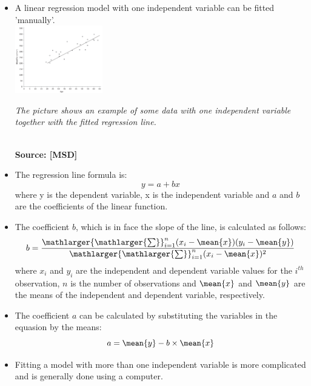 \begin{itemize}
\item A linear regression model with one independent variable can be fitted 'manually'.\\ [1ex]
  \includegraphics[width=0.3\textwidth]{msd6-5_linear_regression.png} \parbox[t]{0.3\textwidth}{\vspace{-20ex}\tiny \emph{The picture shows an example of some data with one independent variable together with the fitted regression line.}} \\ [-2ex]
  {\fontsize{10}{0}\selectfont \textbf{Source: [MSD]}} 
\item The regression line formula is:
  $$ y = a + bx$$
  where y is the dependent variable, x is the independent variable and $a$ and $b$ are the coefficients of the linear function.
\item The coefficient $b$, which is in face the slope of the line, is calculated as follows:
  $$ b = \dfrac{\mathlarger{\mathlarger{\sum}}_{i=1}^n(x_i-\mean{x})(y_i-\mean{y})}{\mathlarger{\mathlarger{\sum}}_{i=1}^n(x_i-\mean{x})^2} $$
  where $x_i$ and $y_i$ are the independent and dependent variable values for the $i^{th}$ observation, $n$ is the number of observations and $\mean{x}$ and $\mean{y}$ are the means of the independent and dependent variable, respectively. \\
\item The coefficient $a$ can be calculated by substituting the variables in the equasion by the means:
  $$ a = \mean{y} - b\times \mean{x} $$
\item Fitting a model with more than one independent variable is more complicated and is generally done using a computer.
\end{itemize}
\newpage


